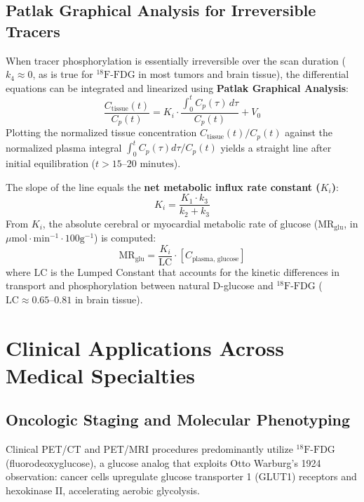 \documentclass[11pt,a4paper]{article}
\begin{document}
\subsection{Patlak Graphical Analysis for Irreversible Tracers}
When tracer phosphorylation is essentially irreversible over the scan duration ($k_4 \approx 0$, as is true for $^{18}\text{F}\text{-FDG}$ in most tumors and brain tissue), the differential equations can be integrated and linearized using \textbf{Patlak Graphical Analysis}:
\begin{equation}
    \frac{C_{\text{tissue}}(t)}{C_p(t)} = K_i \cdot \frac{\int_0^t C_p(\tau) \, d\tau}{C_p(t)} + V_0
\end{equation}
Plotting the normalized tissue concentration $C_{\text{tissue}}(t) / C_p(t)$ against the normalized plasma integral $\int_0^t C_p(\tau) d\tau / C_p(t)$ yields a straight line after initial equilibration ($t > 15\text{--}20\text{ minutes}$).

The slope of the line equals the \textbf{net metabolic influx rate constant ($K_i$)}:
\begin{equation}
    K_i = \frac{K_1 \cdot k_3}{k_2 + k_3}
\end{equation}
From $K_i$, the absolute cerebral or myocardial metabolic rate of glucose ($\text{MR}_{\text{glu}}$, in $\mu\text{mol}\cdot\text{min}^{-1}\cdot 100\text{g}^{-1}$) is computed:
\begin{equation}
    \text{MR}_{\text{glu}} = \frac{K_i}{\text{LC}} \cdot [C_{\text{plasma, glucose}}]
\end{equation}
where $\text{LC}$ is the Lumped Constant that accounts for the kinetic differences in transport and phosphorylation between natural D-glucose and $^{18}\text{F}\text{-FDG}$ ($\text{LC} \approx 0.65\text{--}0.81$ in brain tissue).

\section{Clinical Applications Across Medical Specialties}

\subsection{Oncologic Staging and Molecular Phenotyping}
Clinical PET/CT and PET/MRI procedures predominantly utilize \textbf{$^{18}\text{F}\text{-FDG}$} (fluorodeoxyglucose), a glucose analog that exploits Otto Warburg's 1924 observation: cancer cells upregulate glucose transporter 1 (GLUT1) receptors and hexokinase II, accelerating aerobic glycolysis. 
\end{document}
